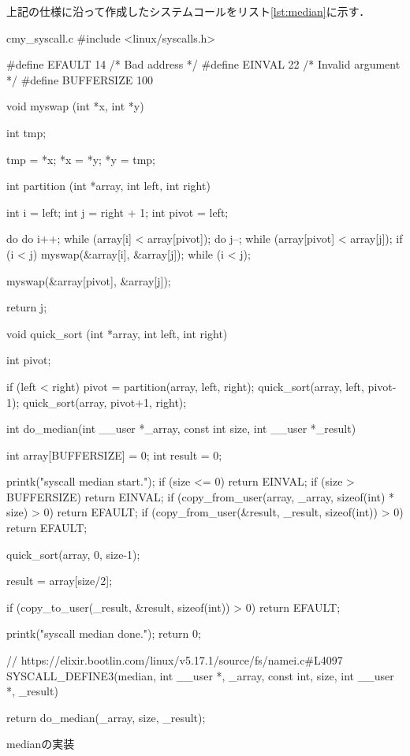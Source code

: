 上記の仕様に沿って作成したシステムコールをリスト\ref{lst:median}に示す．
\begin{longlisting}
\begin{myminted}{c}{my\_syscall.c}
#include <linux/syscalls.h>

#define	EFAULT 14	/* Bad address */
#define	EINVAL 22	/* Invalid argument */
#define BUFFERSIZE 100

void myswap (int *x, int *y) {
    int tmp;

    tmp = *x;
    *x = *y;
    *y = tmp;
}

int partition (int *array, int left, int right) {
    int i = left;
    int j = right + 1;
    int pivot = left;

    do {
        do { i++; } while (array[i] < array[pivot]);
        do { j--; } while (array[pivot] < array[j]);
        if (i < j) { myswap(&array[i], &array[j]); }
    } while (i < j);

    myswap(&array[pivot], &array[j]);

    return j;
}

void quick_sort (int *array, int left, int right) {
    int pivot;

    if (left < right) {
        pivot = partition(array, left, right);
        quick_sort(array, left, pivot-1);
        quick_sort(array, pivot+1, right);
    }
}

int do_median(int __user *_array, const int size, int __user *_result) {
    int array[BUFFERSIZE] = {0};
    int result = 0;

    printk("syscall median start.");
    if (size <= 0) return EINVAL;
    if (size > BUFFERSIZE) return EINVAL;
    if (copy_from_user(array, _array, sizeof(int) * size) > 0) return EFAULT;
    if (copy_from_user(&result, _result, sizeof(int)) > 0) return EFAULT;

    quick_sort(array, 0, size-1);

    result = array[size/2];

    if (copy_to_user(_result, &result, sizeof(int)) > 0) return EFAULT;
    
    printk("syscall median done.");
    return 0;
}

// https://elixir.bootlin.com/linux/v5.17.1/source/fs/namei.c#L4097
SYSCALL_DEFINE3(median,
        int __user *, _array,
        const int, size,
        int __user *, _result) {

    return do_median(_array, size, _result);
}
\end{myminted}
\caption{medianの実装}
\label{lst:median}
\end{longlisting}

